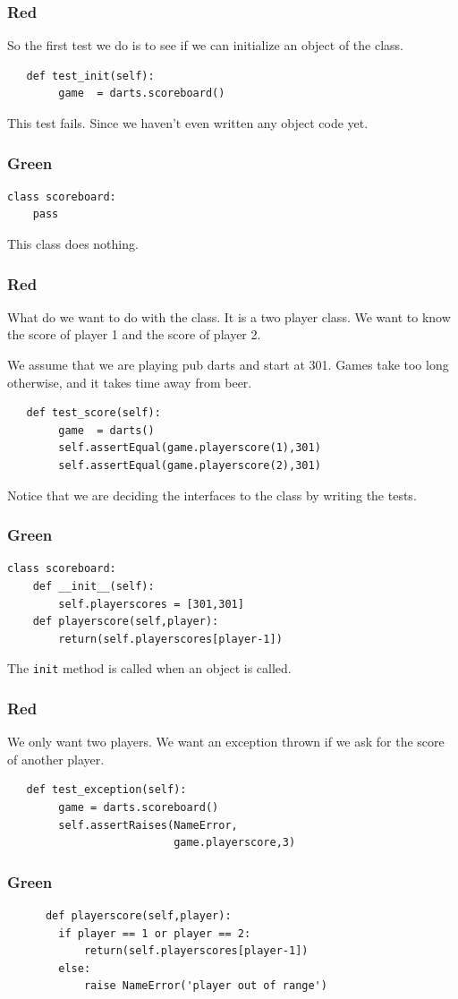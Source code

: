 \documentclass{beamer}
\begin{document}
\begin{frame}[fragile]
  \frametitle{Red}
So the first test we do is to see if we can initialize an object of
the class.

\begin{lstlisting}
   def test_init(self):
        game  = darts.scoreboard()
\end{lstlisting}
This test fails. Since we haven't even written any object code yet.
\end{frame}
\begin{frame}[fragile]
\frametitle{Green}
\begin{lstlisting}
class scoreboard:
    pass
\end{lstlisting}
This class does nothing.  
\end{frame}
\begin{frame}[fragile]
\frametitle{Red}
What do we want to do with the class. It is a two player class. We
want to know the score of player 1 and the score of player 2.

We assume that we are playing pub darts and start at 301. Games take
too long otherwise, and it takes time away from beer.
\begin{lstlisting}
   def test_score(self):
        game  = darts()
        self.assertEqual(game.playerscore(1),301)
        self.assertEqual(game.playerscore(2),301)
\end{lstlisting}
Notice that we are deciding the interfaces to the class by writing the tests.
\end{frame}
\begin{frame}[fragile]
\frametitle{Green}
\begin{lstlisting}
class scoreboard:
    def __init__(self):
        self.playerscores = [301,301]
    def playerscore(self,player):
        return(self.playerscores[player-1])
\end{lstlisting}
The {\tt init} method is called when an object is called.  
\end{frame}
\begin{frame}[fragile]
\frametitle{Red}
We only want two players. We want an exception thrown if we ask for
the score of another player.
\begin{lstlisting}
   def test_exception(self):
        game = darts.scoreboard()
        self.assertRaises(NameError,
                          game.playerscore,3)
\end{lstlisting}
\end{frame}

\begin{frame}[fragile]
\frametitle{Green}
\begin{lstlisting}
      def playerscore(self,player):
        if player == 1 or player == 2:
            return(self.playerscores[player-1])
        else:
            raise NameError('player out of range')
\end{lstlisting}
    
\end{frame}
\end{document}
